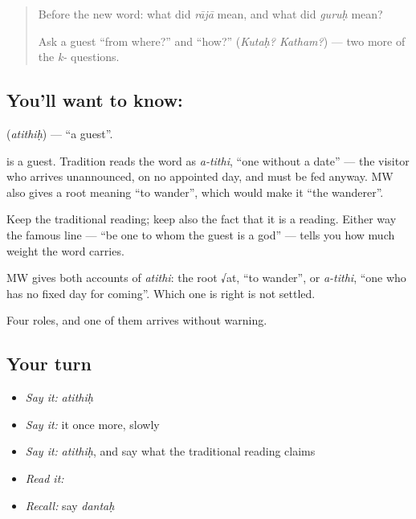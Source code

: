 \label{lesson:SA-C26-guest}



\begin{quote}
Before the new word: what did \emph{rājā} mean, and what did \emph{guruḥ} mean?

Ask a guest \textquotedblleft{}from where?\textquotedblright{} and \textquotedblleft{}how?\textquotedblright{} (\emph{Kutaḥ? Katham?}) — two more of the \emph{k-} questions.
\end{quote}

\subsection*{You'll want to know: }
\textbf{} (\emph{atithiḥ}) — \textquotedblleft{}a guest\textquotedblright{}.

\textbf{} is a guest. Tradition reads the word as \emph{a-tithi}, \textquotedblleft{}one without a date\textquotedblright{} — the visitor who arrives unannounced, on no appointed day, and must be fed anyway. MW also gives a root meaning \textquotedblleft{}to wander\textquotedblright{}, which would make it \textquotedblleft{}the wanderer\textquotedblright{}.

Keep the traditional reading; keep also the fact that it is a reading. Either way the famous line \textbf{ } — \textquotedblleft{}be one to whom the guest is a god\textquotedblright{} — tells you how much weight the word carries.

\begin{cousinweb}
MW gives both accounts of \emph{atithi}: the root √at, \textquotedblleft{}to wander\textquotedblright{}, or \emph{a-tithi}, \textquotedblleft{}one who has no fixed day for coming\textquotedblright{}. Which one is right is not settled.
\end{cousinweb}

\begin{grammarlens}[title={What you've built}]
Four roles, and one of them arrives without warning.
\end{grammarlens}

\subsection*{Your turn}
\begin{itemize}
\raggedright
  \item \emph{Say it:} \emph{atithiḥ}
  \item \emph{Say it:} it once more, slowly
  \item \emph{Say it:} \emph{atithiḥ}, and say what the traditional reading claims
  \item \emph{Read it:} \textbf{}
  \item \emph{Recall:} say \emph{dantaḥ}
\end{itemize}

